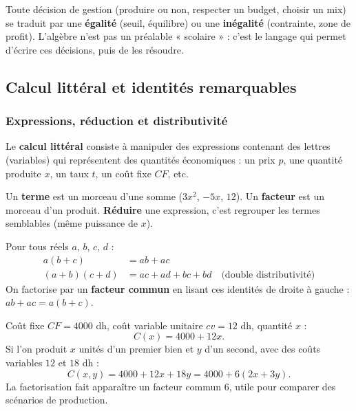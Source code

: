 \documentclass[12pt,a4paper]{article}
\begin{document}
\begin{attentionbox}
Toute décision de gestion (produire ou non, respecter un budget, choisir un mix) se traduit par une \textbf{égalité} (seuil, équilibre) ou une \textbf{inégalité} (contrainte, zone de profit). L'algèbre n'est pas un préalable « scolaire » : c'est le langage qui permet d'écrire ces décisions, puis de les résoudre.
\end{attentionbox}

\subsection{Calcul littéral et identités remarquables}

\subsubsection{Expressions, réduction et distributivité}

Le \textbf{calcul littéral} consiste à manipuler des expressions contenant des lettres (variables) qui représentent des quantités économiques : un prix $p$, une quantité produite $x$, un taux $t$, un coût fixe $CF$, etc.

\begin{definitionbox}
Un \textbf{terme} est un morceau d'une somme ($3x^2$, $-5x$, $12$). Un \textbf{facteur} est un morceau d'un produit. \textbf{Réduire} une expression, c'est regrouper les termes semblables (même puissance de $x$).
\end{definitionbox}

\begin{propbox}[Distributivité]
Pour tous réels $a$, $b$, $c$, $d$ :
\begin{align}
a(b+c) &= ab + ac \\
(a+b)(c+d) &= ac + ad + bc + bd \quad \text{(double distributivité)}
\end{align}
On factorise par un \textbf{facteur commun} en lisant ces identités de droite à gauche :
$ab + ac = a(b+c)$.
\end{propbox}

\begin{exemplebox}
Coût fixe $CF = 4000$ dh, coût variable unitaire $cv = 12$ dh, quantité $x$ :
$$C(x) = 4000 + 12x.$$
Si l'on produit $x$ unités d'un premier bien et $y$ d'un second, avec des coûts variables $12$ et $18$ dh :
$$C(x,y) = 4000 + 12x + 18y = 4000 + 6(2x+3y).$$
La factorisation fait apparaître un facteur commun $6$, utile pour comparer des scénarios de production.
\end{exemplebox}
\end{document}
